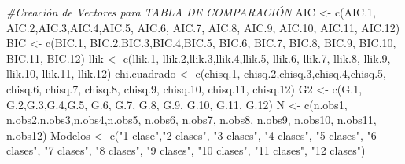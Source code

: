 \documentclass[
]{article}
\newenvironment{Shaded}{\begin{snugshade}}{\end{snugshade}}
\newcommand{\CommentTok}[1]{\textcolor[rgb]{0.56,0.35,0.01}{\textit{#1}}}
\newcommand{\FloatTok}[1]{\textcolor[rgb]{0.00,0.00,0.81}{#1}}
\newcommand{\FunctionTok}[1]{\textcolor[rgb]{0.00,0.00,0.00}{#1}}
\newcommand{\NormalTok}[1]{#1}
\newcommand{\OtherTok}[1]{\textcolor[rgb]{0.56,0.35,0.01}{#1}}
\newcommand{\StringTok}[1]{\textcolor[rgb]{0.31,0.60,0.02}{#1}}
\begin{document}
\begin{Shaded}
\begin{Highlighting}[]
\CommentTok{\#Creación de Vectores para TABLA DE COMPARACIÓN}
\NormalTok{AIC }\OtherTok{\textless{}{-}} \FunctionTok{c}\NormalTok{(AIC}\FloatTok{.1}\NormalTok{, AIC}\FloatTok{.2}\NormalTok{,AIC}\FloatTok{.3}\NormalTok{,AIC}\FloatTok{.4}\NormalTok{,AIC}\FloatTok{.5}\NormalTok{, AIC}\FloatTok{.6}\NormalTok{, AIC}\FloatTok{.7}\NormalTok{, AIC}\FloatTok{.8}\NormalTok{, AIC}\FloatTok{.9}\NormalTok{, AIC}\FloatTok{.10}\NormalTok{, AIC}\FloatTok{.11}\NormalTok{, AIC}\FloatTok{.12}\NormalTok{)}
\NormalTok{BIC }\OtherTok{\textless{}{-}} \FunctionTok{c}\NormalTok{(BIC}\FloatTok{.1}\NormalTok{, BIC}\FloatTok{.2}\NormalTok{,BIC}\FloatTok{.3}\NormalTok{,BIC}\FloatTok{.4}\NormalTok{,BIC}\FloatTok{.5}\NormalTok{, BIC}\FloatTok{.6}\NormalTok{, BIC}\FloatTok{.7}\NormalTok{, BIC}\FloatTok{.8}\NormalTok{, BIC}\FloatTok{.9}\NormalTok{, BIC}\FloatTok{.10}\NormalTok{, BIC}\FloatTok{.11}\NormalTok{, BIC}\FloatTok{.12}\NormalTok{)}
\NormalTok{llik }\OtherTok{\textless{}{-}} \FunctionTok{c}\NormalTok{(llik}\FloatTok{.1}\NormalTok{, llik}\FloatTok{.2}\NormalTok{,llik}\FloatTok{.3}\NormalTok{,llik}\FloatTok{.4}\NormalTok{,llik}\FloatTok{.5}\NormalTok{, llik}\FloatTok{.6}\NormalTok{, llik}\FloatTok{.7}\NormalTok{, llik}\FloatTok{.8}\NormalTok{, llik}\FloatTok{.9}\NormalTok{, llik}\FloatTok{.10}\NormalTok{, llik}\FloatTok{.11}\NormalTok{, llik}\FloatTok{.12}\NormalTok{)}
\NormalTok{chi.cuadrado }\OtherTok{\textless{}{-}} \FunctionTok{c}\NormalTok{(chisq}\FloatTok{.1}\NormalTok{, chisq}\FloatTok{.2}\NormalTok{,chisq}\FloatTok{.3}\NormalTok{,chisq}\FloatTok{.4}\NormalTok{,chisq}\FloatTok{.5}\NormalTok{, chisq}\FloatTok{.6}\NormalTok{, chisq}\FloatTok{.7}\NormalTok{, chisq}\FloatTok{.8}\NormalTok{, chisq}\FloatTok{.9}\NormalTok{, chisq}\FloatTok{.10}\NormalTok{, chisq}\FloatTok{.11}\NormalTok{, chisq}\FloatTok{.12}\NormalTok{)}
\NormalTok{G2 }\OtherTok{\textless{}{-}} \FunctionTok{c}\NormalTok{(G}\FloatTok{.1}\NormalTok{, G}\FloatTok{.2}\NormalTok{,G}\FloatTok{.3}\NormalTok{,G}\FloatTok{.4}\NormalTok{,G}\FloatTok{.5}\NormalTok{, G}\FloatTok{.6}\NormalTok{, G}\FloatTok{.7}\NormalTok{, G}\FloatTok{.8}\NormalTok{, G}\FloatTok{.9}\NormalTok{, G}\FloatTok{.10}\NormalTok{, G}\FloatTok{.11}\NormalTok{, G}\FloatTok{.12}\NormalTok{)}
\NormalTok{N }\OtherTok{\textless{}{-}} \FunctionTok{c}\NormalTok{(n.obs1, n.obs2,n.obs3,n.obs4,n.obs5, n.obs6, n.obs7, n.obs8, n.obs9, n.obs10, n.obs11, n.obs12)}
\NormalTok{Modelos }\OtherTok{\textless{}{-}} \FunctionTok{c}\NormalTok{(}\StringTok{"1 clase"}\NormalTok{,}\StringTok{"2 clases"}\NormalTok{, }\StringTok{"3 clases"}\NormalTok{, }\StringTok{"4 clases"}\NormalTok{, }\StringTok{"5 clases"}\NormalTok{, }\StringTok{"6 clases"}\NormalTok{, }\StringTok{"7 clases"}\NormalTok{, }\StringTok{"8 clases"}\NormalTok{, }\StringTok{"9 clases"}\NormalTok{, }\StringTok{"10 clases"}\NormalTok{, }\StringTok{"11 clases"}\NormalTok{, }\StringTok{"12 clases"}\NormalTok{) }


\end{Highlighting}
\end{Shaded}
\end{document}

